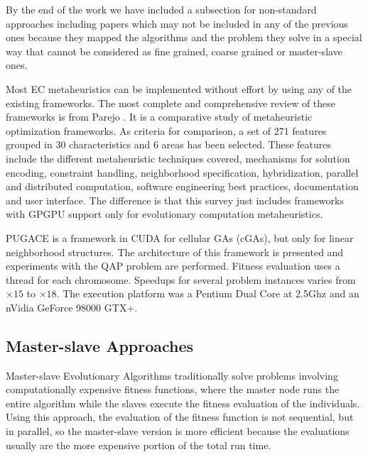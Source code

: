 \documentclass{comjnl}
\begin{document}
By the end of the work we have included a subsection for non-standard approaches \cite{DBLP:conf/gecco/PospichalMOSJ11} including  papers which may not be included in any of the previous ones because they mapped the algorithms and the problem they solve in a special way that cannot be considered as fine grained, coarse grained or master-slave ones.


Most EC metaheuristics can be implemented without effort by using any of the existing frameworks. The most complete and comprehensive review of these frameworks is from Parejo \cite{springerlink:10.1007/s00500-011-0754-8}. It is a comparative study of metaheuristic optimization frameworks. As criteria for comparison, a set of 271 features grouped in 30 characteristics and 6 areas has been selected. These features include the different metaheuristic techniques covered, mechanisms for solution encoding, constraint handling, neighborhood specification, hybridization, parallel and distributed computation, software engineering best practices, documentation and user interface. The difference is that this survey just includes frameworks with GPGPU support only for evolutionary computation metaheuristics. 


PUGACE\cite{5586286} is a framework in CUDA for cellular GAs (cGAs), but only for linear neighborhood structures. The architecture of this framework is presented and experiments with the QAP problem are performed. Fitness evaluation uses a thread for each chromosome. Speedups for several problem instances varies from $\times15$ to $\times18$. The execution platform was a Pentium Dual Core at 2.5Ghz and an nVidia GeForce 98000 GTX+.


\subsection{Master-slave Approaches}
\label{sec:masterSlave}

Master-slave Evolutionary Algorithms traditionally solve problems involving computationally expensive fitness functions, where the master node runs the entire algorithm while the slaves execute the fitness evaluation of the individuals. Using this approach, the evaluation of the fitness function is not sequential, but in parallel, so the master-slave version is more efficient because the evaluations usually are the more expensive portion of the total run time.
\end{document}

